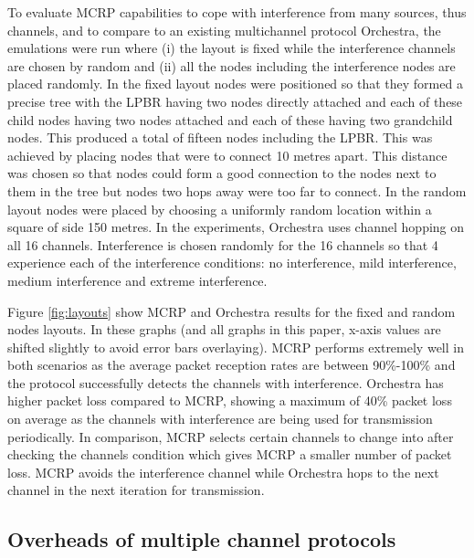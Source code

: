 To evaluate MCRP capabilities to cope with interference from many sources, thus channels, and to compare to an existing multichannel protocol Orchestra, the emulations were run where (i) the layout is fixed while the interference channels are chosen by random and (ii) all the nodes including the interference nodes are placed randomly.
In the fixed layout nodes were positioned so that they formed a precise tree with the LPBR having two nodes directly attached and each of these child nodes having two nodes attached and each of these having two grandchild nodes. This produced a total of fifteen nodes including the LPBR. This was achieved by placing nodes that were to connect 10 metres apart. This distance was chosen so that nodes could form a good connection to the nodes next to them in the tree but nodes two hops away were too far to connect. In the random layout nodes were placed by choosing a uniformly random location within a square of side 150 metres.
In the experiments, Orchestra uses channel hopping on all 16 channels.  Interference is chosen randomly for the 16 channels so that 4 experience each of the interference conditions: no interference, mild interference, medium interference and extreme interference.


Figure \ref{fig:layouts} show MCRP and Orchestra results for the fixed and random nodes layouts.  In these graphs (and all graphs in this paper, x-axis values are shifted slightly to avoid error bars overlaying).
MCRP performs extremely well in both scenarios as the average packet reception rates are between 90\%-100\% and the protocol successfully detects the channels with interference.
Orchestra has higher packet loss compared to MCRP, showing a maximum of 40\% packet loss on average as the channels with interference are being used for transmission periodically. 
In comparison, MCRP selects certain channels to change into after checking the channels condition which gives MCRP a smaller number of packet loss.
MCRP avoids the interference channel while Orchestra hops to the next channel in the next iteration for transmission.

\subsection{Overheads of multiple channel protocols}

